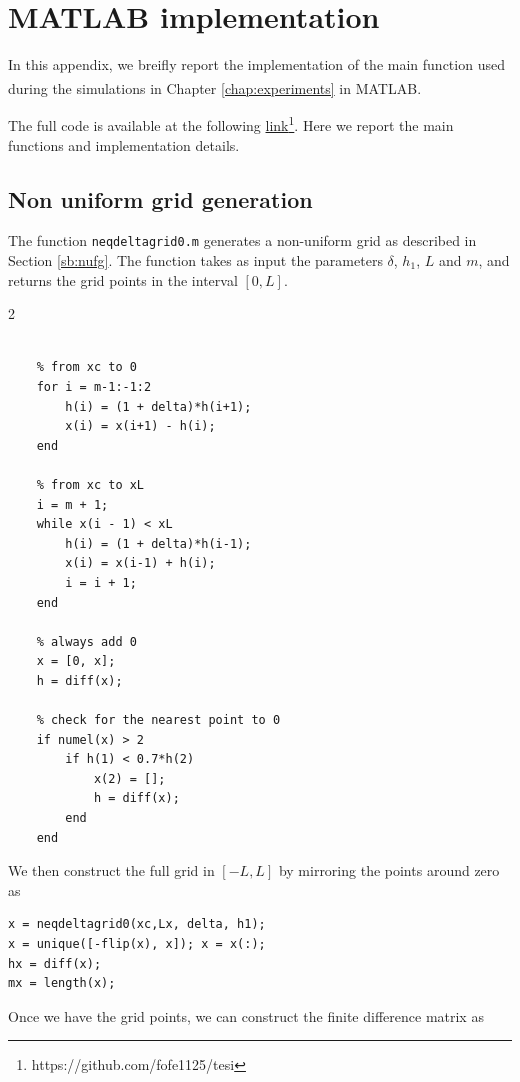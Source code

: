 \chapter{MATLAB\textsuperscript{\textregistered} implementation}

In this appendix, we breifly report the implementation of the main function used during the simulations in Chapter \ref{chap:experiments} in MATLAB\textsuperscript{\textregistered}.

The full code is available at the following \href{https://github.com/fofe1125/tesi}{link}\footnote{https://github.com/fofe1125/tesi}. Here we report the main functions and implementation details.

\section*{Non uniform grid generation}

The function \texttt{neqdeltagrid0.m} generates a non-uniform grid as described in Section \ref{sb:nufg}. The function takes as input the parameters $\delta$, $h_1$, $L$ and $m$, and returns the grid points in the interval $[0, L]$.

\begin{multicols}{2}
    \begin{lstlisting}

    % from xc to 0
    for i = m-1:-1:2
        h(i) = (1 + delta)*h(i+1);
        x(i) = x(i+1) - h(i);
    end

    % from xc to xL
    i = m + 1;
    while x(i - 1) < xL
        h(i) = (1 + delta)*h(i-1);
        x(i) = x(i-1) + h(i);
        i = i + 1;
    end

    % always add 0
    x = [0, x];
    h = diff(x);

    % check for the nearest point to 0
    if numel(x) > 2
        if h(1) < 0.7*h(2)
            x(2) = [];
            h = diff(x);
        end
    end

    \end{lstlisting}
\end{multicols}

We then construct the full grid in $[-L, L]$ by mirroring the points around zero as

\begin{lstlisting}
x = neqdeltagrid0(xc,Lx, delta, h1);
x = unique([-flip(x), x]); x = x(:);
hx = diff(x);
mx = length(x);
\end{lstlisting}

Once we have the grid points, we can construct the finite difference matrix as 


